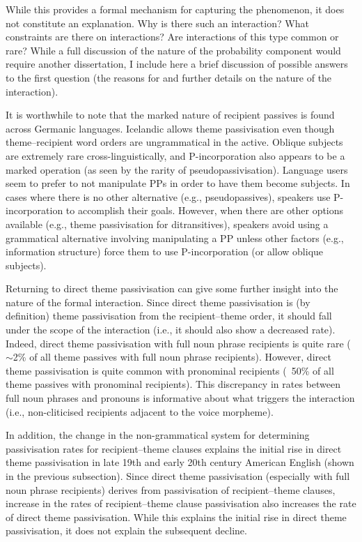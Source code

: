 	While this provides a formal mechanism for capturing the phenomenon, it does not constitute an explanation. Why is there such an interaction? What constraints are there on interactions? Are interactions of this type common or rare? While a full discussion of the nature of the probability component would require another dissertation, I include here a brief discussion of possible answers to the first question (the reasons for and further details on the nature of the interaction). 

	It is worthwhile to note that the marked nature of recipient passives is found across Germanic languages. Icelandic allows theme passivisation even though theme--recipient word orders are ungrammatical in the active. Oblique subjects are extremely rare cross-linguistically, and P-incorporation also appears to be a marked operation (as seen by the rarity of pseudopassivisation). Language users seem to prefer to not manipulate PPs in order to have them become subjects. In cases where there is no other alternative (e.g., pseudopassives), speakers use P-incorporation to accomplish their goals. However, when there are other options available (e.g., theme passivisation for ditransitives), speakers avoid using a grammatical alternative involving manipulating a PP unless other factors (e.g., information structure) force them to use P-incorporation (or allow oblique subjects). 

	Returning to direct theme passivisation can give some further insight into the nature of the formal interaction. Since direct theme passivisation is (by definition) theme passivisation from the recipient--theme order, it should fall under the scope of the interaction (i.e., it should also show a decreased rate). Indeed, direct theme passivisation with full noun phrase recipients is quite rare ($\sim$2\% of all theme passives with full noun phrase recipients). However, direct theme passivisation is quite common with pronominal recipients (~50\% of all theme passives with pronominal recipients). This discrepancy in rates between full noun phrases and pronouns is informative about what triggers the interaction (i.e., non-cliticised recipients adjacent to the voice morpheme).

	In addition, the change in the non-grammatical system for determining passivisation rates for recipient--theme clauses explains the initial rise in direct theme passivisation in late 19th and early 20th century American English (shown in the previous subsection). Since direct theme passivisation (especially with full noun phrase recipients) derives from passivisation of recipient--theme clauses, increase in the rates of recipient--theme clause passivisation also increases the rate of direct theme passivisation. While this explains the initial rise in direct theme passivisation, it does not explain the subsequent decline.
	
